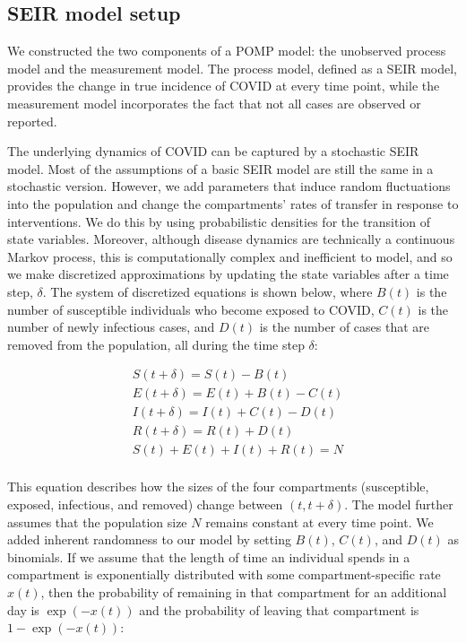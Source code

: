 \documentclass{article}
\begin{document}
\subsection{SEIR model setup}

We constructed the two components of a POMP model: the unobserved process model and the measurement model. The process model, defined as a SEIR model, provides the change in true incidence of COVID at every time point, while the measurement model incorporates the fact that not all cases are observed or reported.

The underlying dynamics of COVID can be captured by a stochastic SEIR model. Most of the assumptions of a basic SEIR model  are still the same in a stochastic version. However, we add parameters that induce random fluctuations into the population and change the compartments’ rates of transfer in response to interventions. We do this by using probabilistic densities for the transition of state variables. Moreover, although disease dynamics are technically a continuous Markov process, this is computationally complex and inefficient to model, and so we make discretized approximations by updating the state variables after a time step, $\delta$. The system of discretized equations is shown below, where $B(t)$ is the number of susceptible individuals who become exposed to COVID, $C(t)$ is the number of newly infectious cases, and $D(t)$ is the number of cases that are removed from the population, all during the time step $\delta$:

\begin{equation}
\begin{aligned}
& S(t+\delta) = S(t)- B(t) \\
& E(t+\delta) = E(t)+ B(t)- C(t) \\
& I(t+\delta) = I(t)+ C(t)- D(t) \\
& R(t+\delta) = R(t)+D(t) \\
& S(t)+ E(t)+ I(t)+ R(t) = N  \\
\end{aligned}
\end{equation}

This equation describes how the sizes of the four compartments (susceptible, exposed, infectious, and removed) change between $(t,t+\delta)$. The model further assumes that the population size $N$ remains constant at every time point. We added inherent randomness to our model by setting $B(t)$, $C(t)$, and $D(t)$ as binomials. If we assume that the length of time an individual spends in a compartment is exponentially distributed with some compartment-specific rate $x(t)$, then the probability of remaining in that compartment for an additional day is $\exp(-x(t))$ and the probability of leaving that compartment is $1-\exp(-x(t))$:
\end{document}
